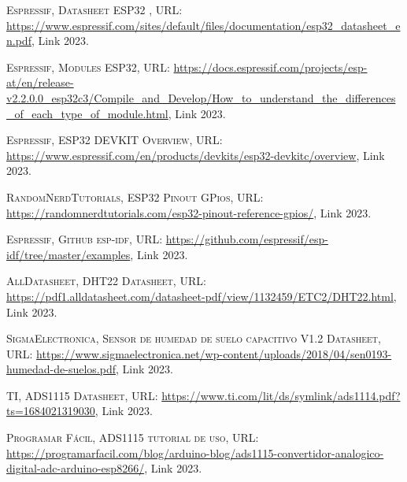\begin{thebibliography}{X}
 \textsc{Espressif}, \textsc{Datasheet ESP32} ,  URL: \url{https://www.espressif.com/sites/default/files/documentation/esp32_datasheet_en.pdf}, Link 2023.

 \textsc{Espressif}, \textsc{Modules ESP32},  URL: \url{https://docs.espressif.com/projects/esp-at/en/release-v2.2.0.0_esp32c3/Compile_and_Develop/How_to_understand_the_differences_of_each_type_of_module.html}, Link 2023.

 \textsc{Espressif}, \textsc{ESP32 DEVKIT Overview},  URL: \url{https://www.espressif.com/en/products/devkits/esp32-devkitc/overview}, Link 2023.

 \textsc{RandomNerdTutorials}, \textsc{ESP32 Pinout GPios}, URL: \url{https://randomnerdtutorials.com/esp32-pinout-reference-gpios/}, Link 2023.

 \textsc{Espressif}, \textsc{Github esp-idf},  URL: \url{https://github.com/espressif/esp-idf/tree/master/examples}, Link 2023.

 \textsc{AllDatasheet}, \textsc{DHT22 Datasheet},  URL: \url{https://pdf1.alldatasheet.com/datasheet-pdf/view/1132459/ETC2/DHT22.html}, Link 2023.

 \textsc{SigmaElectronica}, \textsc{Sensor de humedad de suelo capacitivo V1.2 Datasheet},  URL: \url{https://www.sigmaelectronica.net/wp-content/uploads/2018/04/sen0193-humedad-de-suelos.pdf}, Link 2023.

 \textsc{TI}, \textsc{ADS1115 Datasheet},  URL: \url{https://www.ti.com/lit/ds/symlink/ads1114.pdf?ts=1684021319030}, Link 2023.

 \textsc{Programar Fácil}, \textsc{ADS1115 tutorial de uso},  URL: \url{https://programarfacil.com/blog/arduino-blog/ads1115-convertidor-analogico-digital-adc-arduino-esp8266/}, Link 2023.



\end{thebibliography}